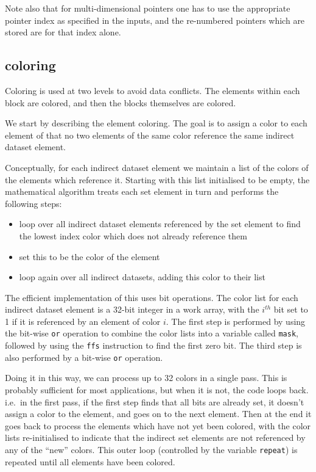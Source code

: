 \documentclass[12pt]{article}
\begin{document}
Note also that for multi-dimensional pointers one has to use the
appropriate pointer index as specified in the inputs, and the 
re-numbered pointers which are stored are for that index alone.

\newpage

\subsection{coloring}

Coloring is used at two levels to avoid data conflicts.  The 
elements within each block are colored, and then the blocks 
themselves are colored.

We start by describing the element coloring. The goal is 
to assign a color to each element of that no two elements
of the same color reference the same indirect dataset element.

Conceptually, for each indirect dataset element we maintain
a list of the colors of the elements which reference it. 
Starting with this list initialised to be empty, the mathematical
algorithm treats each set element in turn and performs the 
following steps:
\begin{itemize}
\item 
loop over all indirect dataset elements referenced by the set
element to find the lowest index color which does not already 
reference them
\item
set this to be the color of the element
\item
loop again over all indirect datasets, adding this color
to their list
\end{itemize}

The efficient implementation of this uses bit operations.
The color list for each indirect dataset element is a 
32-bit integer in a work array, with the $i^{th}$ bit set 
to 1 if it is referenced by an element of color $i$.
The first step is performed by using the bit-wise {\tt or}
operation to combine the color lists into a variable called
{\tt mask}, followed by using the {\tt ffs} instruction to 
find the first zero bit.  The third step is also performed 
by a bit-wise {\tt or} operation.

Doing it in this way, we can process up to 32 colors in a 
single pass.  This is probably sufficient for most applications, 
but when it is not, the code loops back. i.e.~in the first pass,
if the first step finds that all bits are already set, it doesn't 
assign a color to the element, and goes on to the next element.
Then at the end it goes back to process the elements which have 
not yet been colored, with the color lists re-initialised to
indicate that the indirect set elements are not referenced by 
any of the ``new'' colors.  This outer loop (controlled by the 
variable {\tt repeat}) is repeated until all elements have been 
colored.
\end{document}

